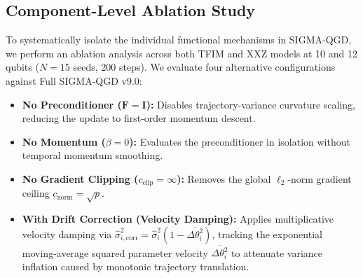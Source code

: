 \documentclass[11pt,a4paper]{article}
\begin{document}
\subsection{Component-Level Ablation Study}
\label{sec:ablation_results}
To systematically isolate the individual functional mechanisms in SIGMA-QGD, we perform an ablation analysis across both TFIM and XXZ models at 10 and 12 qubits ($N=15$ seeds, 200 steps). We evaluate four alternative configurations against Full SIGMA-QGD v9.0:
\begin{itemize}
    \item \textbf{No Preconditioner ($\mathbf{F}=\mathbf{I}$):} Disables trajectory-variance curvature scaling, reducing the update to first-order momentum descent.
    \item \textbf{No Momentum ($\beta=0$):} Evaluates the preconditioner in isolation without temporal momentum smoothing.
    \item \textbf{No Gradient Clipping ($c_{\text{clip}}=\infty$):} Removes the global $\ell_2$-norm gradient ceiling $c_{\text{norm}} = \sqrt{p}$.
    \item \textbf{With Drift Correction (Velocity Damping):} Applies multiplicative velocity damping via $\hat{\sigma}_{i,\text{corr}}^2 = \hat{\sigma}_i^2(1 - \overline{\Delta \theta_i^2})$, tracking the exponential moving-average squared parameter velocity $\overline{\Delta \theta_i^2}$ to attenuate variance inflation caused by monotonic trajectory translation.
\end{itemize}
\end{document}

